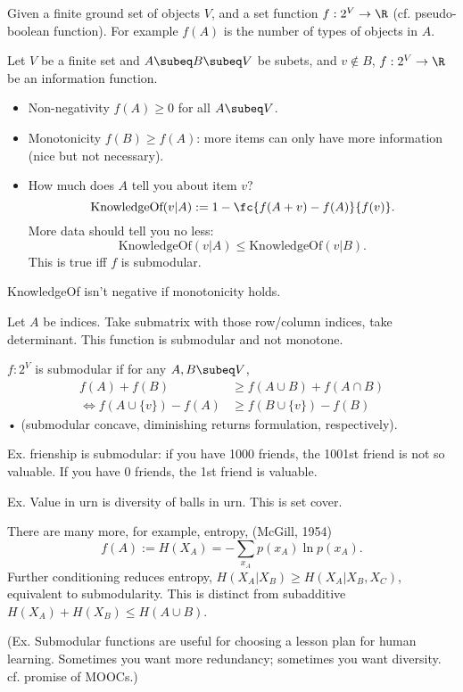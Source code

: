 Given a finite ground set of objects $V$, and a set function $f:2^V\to \R$ (cf. pseudo-boolean function). For example $f(A)$ is the number of types of objects in $A$.

Let $V$ be a finite set and $A\subeq B\subeq V$ be subets, and $v\nin B$, $f:2^V\to \R$ be an information function.
\begin{itemize}
\item
Non-negativity $f(A)\ge 0$ for all $A\subeq V$.
\item
Monotonicity $f(B)\ge f(A)$: more items can only have more information (nice but not necessary).
\item
How much does $A$ tell you about item $v$?
$$
\text{KnowledgeOf}(v|A) := 1-\fc{f(A+v)-f(A)}{f(v)}.
$$
More data should tell you no less:
$$
\text{KnowledgeOf}(v|A) \le \text{KnowledgeOf}(v|B).
$$
This is true iff $f$ is submodular.
\end{itemize}
KnowledgeOf isn't negative if monotonicity holds.

Let $A$ be indices. Take submatrix with those row/column indices, take determinant. This function is submodular and not monotone.


$f:2^V$ is submodular if for any $A,B\subeq V$, 
\begin{align}
f(A)+f(B) &\ge f(A\cup B) + f(A\cap B)\\
\iff f(A\cup \{v\}) -f(A) & \ge f(B\cup \{v\}) - f(B)
\end{align}•
 (submodular concave, diminishing returns formulation, respectively). 
 
Ex. frienship is submodular: if you have 1000 friends, the 1001st friend is not so valuable. If you have 0 friends, the 1st friend is valuable.

Ex. Value in urn is diversity of balls in urn.
This is set cover.

There are many more, for example, entropy, (McGill, 1954)
$$
f(A) := H(X_A) = -\sum_{x_A} p(x_A) \ln p(x_A).
$$
Further conditioning reduces entropy, $H(X_A|X_B) \ge H(X_A|X_B,X_C)$, equivalent to submodularity. This is distinct from subadditive $H(X_A)+H(X_B)\le H(A\cup B)$.

(Ex. Submodular functions are useful for choosing a lesson plan for human learning. Sometimes you want more redundancy; sometimes you want diversity. cf. promise of MOOCs.)

